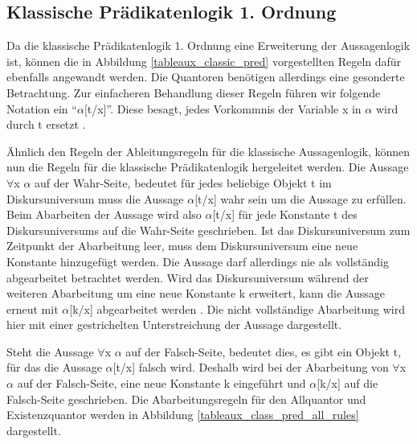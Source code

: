 \subsection{\label{tableaux_classic_pred}Klassische Prädikatenlogik 1. Ordnung}
Da die klassische Prädikatenlogik 1. Ordnung eine Erweiterung der Aussagenlogik ist, können die in Abbildung \ref{tableaux_classic_pred} vorgestellten Regeln dafür ebenfalls angewandt werden. Die Quantoren benötigen allerdings eine gesonderte Betrachtung. Zur einfacheren Behandlung dieser Regeln führen wir folgende Notation ein ``$\alpha$[t/x]''. Diese besagt, jedes Vorkommnis der Variable x in $\alpha$ wird durch t ersetzt \cite{DGHP99}.

Ähnlich den Regeln der Ableitungsregeln für die klassische Aussagenlogik, können nun die Regeln für die klassische Prädikatenlogik hergeleitet werden. Die Aussage $\forall$x $\alpha$ auf der Wahr-Seite, bedeutet für jedes beliebige Objekt t im Diskursuniversum muss die Aussage $\alpha$[t/x] wahr sein um die Aussage zu erfüllen. Beim Abarbeiten der Aussage wird also $\alpha$[t/x] für jede Konstante t des Diskursuniversums auf die Wahr-Seite geschrieben. Ist das Diskursuniversum zum Zeitpunkt der Abarbeitung leer, muss dem Diskursuniversum eine neue Konstante hinzugefügt werden. Die Aussage darf allerdings nie als vollständig abgearbeitet betrachtet werden. Wird das Diskursuniversum während der weiteren Abarbeitung um eine neue Konstante k erweitert, kann die Aussage erneut mit $\alpha$[k/x] abgearbeitet werden \cite{KB14}. Die nicht vollständige Abarbeitung wird hier mit einer gestrichelten Unterstreichung der Aussage dargestellt.

Steht die Aussage $\forall$x $\alpha$ auf der Falsch-Seite, bedeutet dies, es gibt ein Objekt t, für das die Aussage $\alpha$[t/x] falsch wird. Deshalb wird bei der Abarbeitung von $\forall$x $\alpha$ auf der Falsch-Seite, eine neue Konstante k eingeführt und $\alpha$[k/x] auf die Falsch-Seite geschrieben. Die Abarbeitungsregeln für den Allquantor und Existenzquantor werden in Abbildung \ref{tableaux_class_pred_all_rules} dargestellt.

